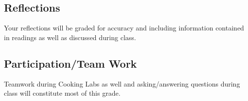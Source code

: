 \documentclass{article}
\begin{document}
\subsection{Reflections} Your reflections will be graded for accuracy and including information contained in readings as well as discussed during class.

\subsection{Participation/Team Work} Teamwork during Cooking Labs as well and asking/answering questions during class will constitute most of this grade.
\end{document}

